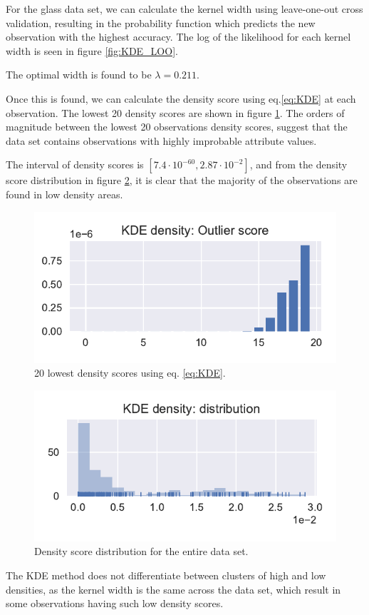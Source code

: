 For the glass data set, we can calculate the kernel width using leave-one-out cross validation, resulting in the probability function which predicts the new observation with the highest accuracy. The log of the likelihood for each kernel width is seen in figure \ref{fig:KDE_LOO}.

The optimal width is found to be $\lambda = 0.211$.

Once this is found, we can calculate the density score using eq.\eqref{eq:KDE} at each observation. The lowest 20 density scores are shown in figure \ref{fig:KDE_DensityScore}. The orders of magnitude between the lowest 20 observations density scores, suggest that the data set contains observations with highly improbable attribute values. 

The interval of density scores is $[7.4 \cdot 10^{-60}, 2.87 \cdot 10^{-2}]$, and from the density score distribution in figure \ref{fig:KDE_DensityDistribution}, it is clear that the majority of the observations are found in low density areas.

\begin{multicols}{2}
\begin{figure}[H]
    \includegraphics[width=\linewidth]{fig/KDE_densitybarplot_lowest20.pdf}
    \caption{20 lowest density scores using eq. \eqref{eq:KDE}.}
    \label{fig:KDE_DensityScore}
\end{figure}

\begin{figure}[H]
    \includegraphics[width=\linewidth]{fig/KDE_densitydistribution.pdf}
    \caption{Density score distribution for the entire data set.}
    \label{fig:KDE_DensityDistribution}
\end{figure}
\end{multicols}

The KDE method does not differentiate between clusters of high and low densities, as the kernel width is the same across the data set, which result in some observations having such low density scores. 
